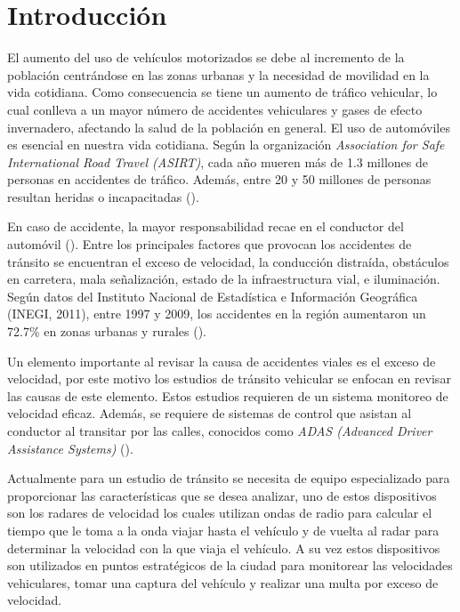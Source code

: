 \chapter{Introducción}

El aumento del uso de vehículos motorizados se debe al incremento de la población centrándose en las zonas urbanas y la necesidad de movilidad en la vida cotidiana. Como consecuencia se tiene un aumento de tráfico vehicular, lo cual conlleva a un mayor número de accidentes vehiculares y gases de efecto invernadero, afectando la salud de la población en general. El uso de automóviles es esencial en nuestra vida cotidiana. Según la organización \textit{Association for Safe International Road Travel (ASIRT)}, cada año mueren más de 1.3 millones de personas en accidentes de tráfico. Además,  entre 20 y 50 millones de personas resultan heridas o incapacitadas (\cite{zaki2020Traffic}).

En caso de accidente, la mayor responsabilidad recae en el conductor del automóvil (\cite{velazquez2017Siniestralidad}). Entre los principales factores que provocan los accidentes de tránsito se encuentran el exceso de velocidad, la conducción distraída, obstáculos en carretera, mala señalización, estado de la infraestructura vial, e iluminación. Según datos del Instituto Nacional de Estadística e Información Geográfica (INEGI, 2011), entre 1997 y 2009, los accidentes en la región aumentaron un 72.7\% en zonas urbanas y rurales (\cite{carro2019Conductas}).

Un elemento importante al revisar la causa de accidentes viales es el exceso de velocidad, por este motivo los estudios de tránsito vehicular se enfocan en revisar las causas de este elemento. Estos estudios requieren de un sistema monitoreo de velocidad eficaz. Además, se requiere de sistemas de control que asistan al conductor al transitar por las calles, conocidos como \textit{ADAS (Advanced Driver Assistance Systems)} (\cite{carro2019Conductas}).

Actualmente para un estudio de tránsito se necesita de equipo especializado para proporcionar las características que se desea analizar, uno de estos dispositivos son los radares de velocidad los cuales utilizan ondas de radio para calcular el tiempo que le toma a la onda viajar hasta el vehículo y de vuelta al radar para determinar la velocidad con la que viaja el vehículo. A su vez estos dispositivos son utilizados en puntos estratégicos de la ciudad para monitorear las velocidades vehiculares, tomar una captura del vehículo y realizar una multa por exceso de velocidad.

